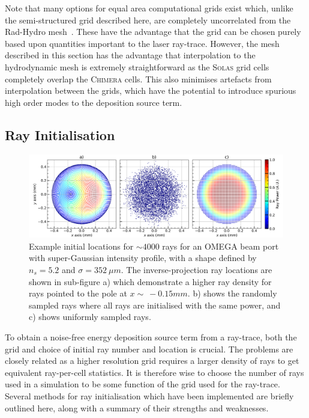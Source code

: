 Note that many options for equal area computational grids exist which, unlike the semi-structured grid described here, are completely uncorrelated from the \ac{Rad-Hydro} mesh~\cite{cheong_eigensolutions_2015,malkin_new_2019}.
These have the advantage that the grid can be chosen purely based upon quantities important to the laser ray-trace.
However, the mesh described in this section has the advantage that interpolation to the hydrodynamic mesh is extremely straightforward as the \textsc{Solas} grid cells completely overlap the \textsc{Chimera} cells.
This also minimises artefacts from interpolation between the grids, which have the potential to introduce spurious high order modes to the deposition source term.

\subsection{Ray Initialisation}%
\label{sec:SOLAS_ray_init}

\begin{figure}[t!]
    \includegraphics[width=\linewidth]{Numerics/Images/ray_init_plots.png}
    \centering
    \caption{Example initial locations for $\sim4000$ rays for an OMEGA beam port with super-Gaussian intensity profile, with a shape defined by $n_s=5.2$ and $\sigma=352\ \mu m$.
    The inverse-projection ray locations are shown in sub-figure a) which demonstrate a higher ray density for rays pointed to the pole at $x\sim\ -0.15 mm$.
    b) shows the randomly sampled rays where all rays are initialised with the same power, and c) shows uniformly sampled rays.}%
    \label{fig:SOLAS_ray_init}
\end{figure}

To obtain a noise-free energy deposition source term from a ray-trace, both the grid and choice of initial ray number and location is crucial.
The problems are closely related as a higher resolution grid requires a larger density of rays to get equivalent ray-per-cell statistics.
It is therefore wise to choose the number of rays used in a simulation to be some function of the grid used for the ray-trace.
Several methods for ray initialisation which have been implemented are briefly outlined here, along with a summary of their strengths and weaknesses.

